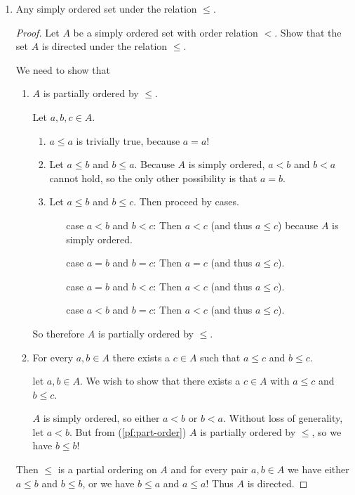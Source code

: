 \documentclass[12pt]{article}
\begin{document}
\begin{enumerate}
    \item Any simply ordered set under the relation $\leq$.
          \begin{proof}
              Let $A$ be a simply ordered set with order relation $<$. Show that the set $A$ is directed under the relation $\leq$.

              We need to show that
              \begin{enumerate}
                  \item\label{pf:part-order} $A$ is partially ordered by $\leq$.

                        Let $a, b, c \in A$.
                        \begin{enumerate}
                            \item $a \leq a$ is trivially true, because $a = a$!
                            \item Let $a \leq b$ and $b \leq a$. Because $A$ is simply ordered, $a < b$ and $b < a$ cannot hold, so the only other possibility is that $a = b$.
                            \item Let $a \leq b$ and $b \leq c$. Then proceed by cases.
                                  \begin{itemize}
                                      \item[case $a < b$ and $b < c$:] Then $a < c$ (and thus $a \leq c$) because $A$ is simply ordered.
                                      \item[case $a = b$ and $b = c$:] Then $a = c$ (and thus $a \leq c$).
                                      \item[case $a = b$ and $b < c$:] Then $a < c$ (and thus $a \leq c$).
                                      \item[case $a < b$ and $b = c$:] Then $a < c$ (and thus $a \leq c$).
                                  \end{itemize}
                        \end{enumerate}
                        So therefore $A$ is partially ordered by $\leq$.
                  \item\label{pf:part-directed} For every $a, b \in A$ there exists a $c \in A$ such that $a \leq c$ and $b \leq c$.

                        let $a, b \in A$. We wish to show that there exists a $c \in A$ with $a \leq c$ and $b \leq c$.

                        $A$ is simply ordered, so either $a < b$ or $b < a$. Without loss of generality, let $a < b$. But from (\ref{pf:part-order}) $A$ is partially ordered by $\leq$, so we have $b \leq b$!
              \end{enumerate}
              Then $\leq$ is a partial ordering on $A$ and for every pair $a, b \in A$ we have either $a \leq b$ and $b \leq b$, or we have $b \leq a$ and $a \leq a$! Thus $A$ is directed.
          \end{proof}


\end{enumerate}
\end{document}
